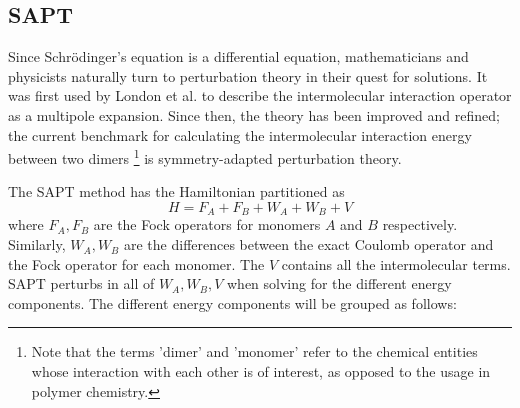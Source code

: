 


\subsection{SAPT}
Since Schr{\"o}dinger's equation is a differential equation, mathematicians and physicists naturally turn to perturbation theory in their quest for solutions.
It was first used by London et al.
to describe the intermolecular interaction operator as a multipole expansion. 
Since then, the theory has been improved and refined; the current benchmark for calculating the intermolecular interaction energy between two dimers 
\footnote{Note that the terms 'dimer' and 'monomer' refer to the chemical entities whose interaction with each other is of interest, as opposed to the usage in polymer chemistry.}
is symmetry-adapted perturbation theory.


The SAPT method has the Hamiltonian partitioned as
\begin{equation*}
    H = F_A + F_B + W_A + W_B + V
\end{equation*}
where $ F_A, F_B $ are the Fock operators for monomers $A$ and $B$ respectively. 
Similarly, $W_A, W_B$ are the differences between the exact Coulomb operator and the Fock operator for each monomer.
The $V$ contains all the intermolecular terms.
SAPT perturbs in all of $W_A, W_B, V$ when solving for the different energy components.
The different energy components will be grouped as follows:

